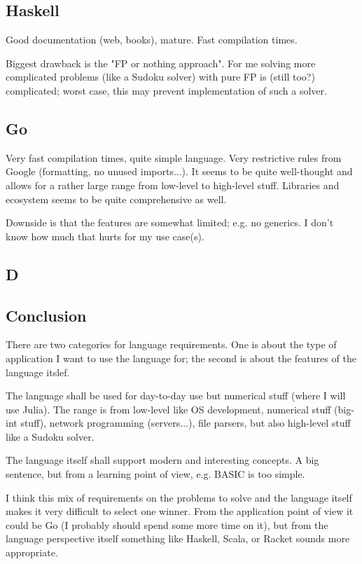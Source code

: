 \subsection{Haskell}

Good documentation (web, books), mature. Fast compilation times.

Biggest drawback is the "FP or nothing approach". For me solving more complicated problems (like a Sudoku solver) with pure FP is (still too?) complicated; worst case, this may prevent implementation of such a solver.

\subsection{Go}

Very fast compilation times, quite simple language. Very restrictive rules from Google (formatting, no unused imports...). It seems to be quite well-thought and allows for a rather large range from low-level to high-level stuff. Libraries and ecosystem seems to be quite comprehensive as well.

Downside is that the features are somewhat limited; e.g. no generics. I don't know how much that hurts for my use case(s).


\subsection{D}



\subsection{Conclusion}

There are two categories for language requirements. One is about the type of application I want to use the language for; the second is about the features of the language itslef.

The language shall be used for day-to-day use but numerical stuff (where I will use Julia). The range is from low-level like OS development, numerical stuff (big-int stuff), network programming (servers...), file parsers, but also high-level stuff like a Sudoku solver.

The language itself shall support modern and interesting concepts. A big sentence, but from a learning point of view, e.g. BASIC is too simple.

I think this mix of requirements on the problems to solve and the language itself makes it very difficult to select one winner. From the application point of view it could be Go (I probably should spend some more time on it), but from the language perspective itself something like Haskell, Scala, or Racket sounds more appropriate.
